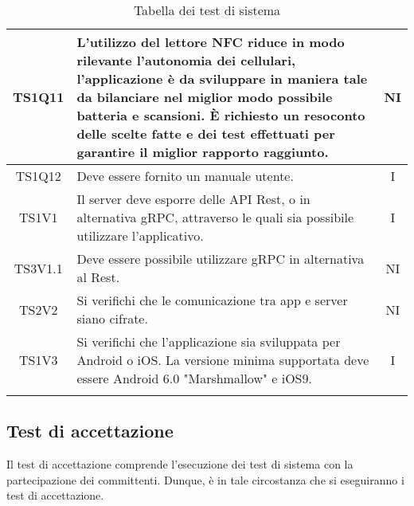 \begin{center}
\begin{longtable}{|c|p{10cm}|c|}
			\hline
			TS1Q11 & L’utilizzo del lettore NFC riduce in modo rilevante l’autonomia dei cellulari, l’applicazione è da sviluppare in maniera tale da bilanciare nel miglior modo possibile batteria e scansioni. È richiesto un resoconto delle scelte fatte e dei test effettuati per garantire il miglior rapporto raggiunto. & NI \\	
			\hline
			TS1Q12 & Deve essere fornito un manuale utente. & I \\	
			\hline
			TS1V1 & Il server deve esporre delle API Rest, o in alternativa gRPC, attraverso le quali sia possibile utilizzare l'applicativo. & I \\	
			\hline
			TS3V1.1 & Deve essere possibile utilizzare gRPC in alternativa al Rest. & NI \\	
			\hline
			TS2V2 & Si verifichi che le comunicazione tra app e server siano cifrate. & NI \\	
			\hline
			TS1V3 & Si verifichi che l'applicazione sia sviluppata per Android o iOS. La versione minima supportata deve essere  Android 6.0 "Marshmallow" e iOS9. & I \\	
			\hline
			\hiderowcolors
			\caption{Tabella dei test di sistema}		
		\end{longtable}	
	\end{center}

	\subsection{Test di accettazione}
	Il test di accettazione comprende l'esecuzione dei test di sistema con la partecipazione dei committenti. Dunque, è in tale circostanza che si eseguiranno i test di accettazione. 
